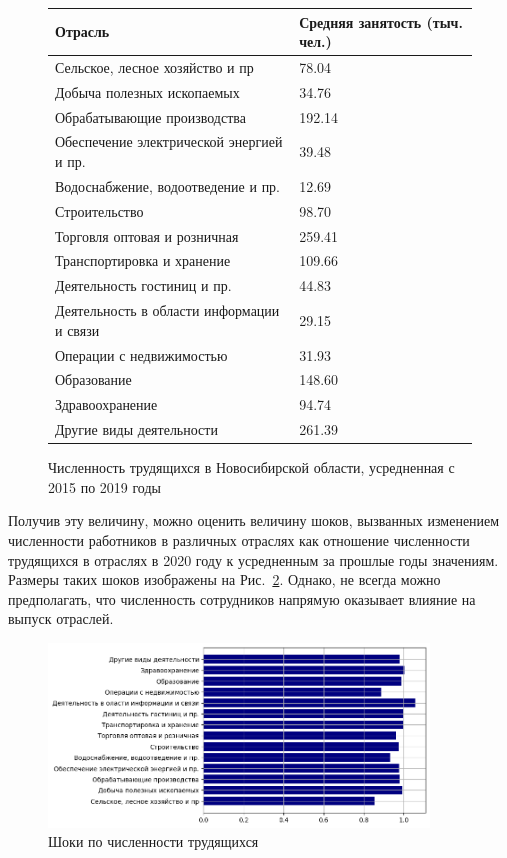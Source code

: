\documentclass[12pt, a4paper]{article}
\begin{document}
\begin{figure}[h]
\begin{center}
\begin{tabular}{|l|l|}
\hline
Отрасль & Средняя занятость (тыч. чел.) \\
\hline
 Сельское, лесное хозяйство и пр &  78.04\\
 Добыча полезных ископаемых & 34.76 \\
 Обрабатывающие производства & 192.14\\
 Обеспечение электрической энергией и пр. &  39.48 \\
 Водоснабжение, водоотведение и пр. & 12.69 \\
 Строительство &  98.70 \\
 Торговля оптовая и розничная & 259.41 \\
Транспортировка и хранение & 109.66 \\
 Деятельность гостиниц и пр. & 44.83 \\
 Деятельность в области информации и связи & 29.15 \\
 Операции с недвижимостью & 31.93\\
 Образование & 148.60 \\
 Здравоохранение & 94.74\\
 Другие виды деятельности & 261.39\\
\hline
\end{tabular}
\label{t_labour}
\caption{Численность трудящихся в Новосибирской области, усредненная с 2015 по 2019 годы}
\end{center}
\end{figure}

Получив эту величину, можно оценить величину шоков, вызванных изменением численности работников в различных отраслях как отношение численности трудящихся в отраслях в 2020 году к усредненным за прошлые годы значениям. Размеры таких шоков изображены на Рис.~\ref{labour_shock}. Однако, не всегда можно предполагать, что численность сотрудников напрямую оказывает влияние на выпуск отраслей. 

\begin{figure}[h]
\includegraphics[width=0.9\textwidth]{pictures/labour_shock.png}
\caption{Шоки по численности трудящихся}
\label{labour_shock}
\end{figure}
\end{document}
